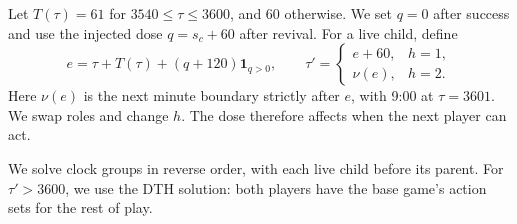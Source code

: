 \documentclass[10pt]{article}
\newcommand{\head}[1]{\par\vspace{5pt}{\fontsize{11}{12}\selectfont\bfseries #1}\par\vspace{2pt}}
\begin{document}
\begin{minipage}[t]{0.55\textwidth}
\head{2. The clock}
Let $T(\tau)=61$ for $3540\le\tau\le3600$, and 60 otherwise.
We set $q=0$ after success and use the injected dose $q=s_c+60$
after revival. For a live child, define
\[
e=\tau+T(\tau)+(q+120)\mathbf1_{q>0},\qquad
\tau'=\begin{cases}e+60,&h=1,\\ \nu(e),&h=2.\end{cases}
\]
Here $\nu(e)$ is the next minute boundary strictly after $e$,
with 9:00 at $\tau=3601$. We swap roles and change $h$.
The dose therefore affects when the next player can act.

We solve clock groups in reverse order, with each live child before
its parent. For $\tau'>3600$, we use the DTH solution: both players
have the base game's action sets for the rest of play.

\end{minipage}\hfill
\end{document}
